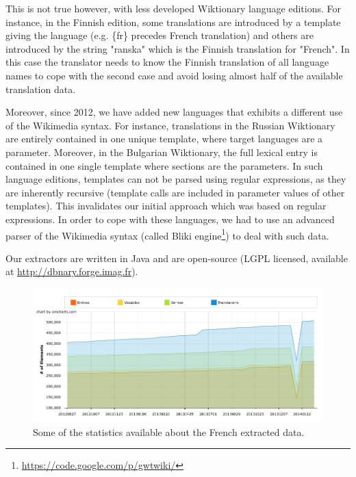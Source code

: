 \documentclass[10pt, a4paper]{article}
\begin{document}
This is not true however, with less developed Wiktionary language editions. For instance, in the Finnish edition, some translations are introduced by a template giving the language (e.g. \{fr\} precedes French translation) and others are introduced by the string "ranska" which is the Finnish translation for "French". In this case the translator needs to know the Finnish translation of all language names to cope with the second case and avoid losing almost half of the available translation data.

Moreover, since 2012, we have added new languages that exhibits a different use of the Wikimedia syntax. For instance, translations in the Russian Wiktionary are entirely contained in one unique template, where target languages are a parameter. Moreover, in the Bulgarian Wiktionary, the full lexical entry is contained in one single template where sections are the parameters. In such language editions, templates can not be parsed using regular expressions, as they are inherently recursive (template calls are included in parameter values of other templates). This invalidates our initial approach which was based on regular expressions. In order to cope with these languages, we had to use an advanced parser of the Wikimedia syntax (called Bliki engine\footnote{\url{https://code.google.com/p/gwtwiki/}}) to deal with such data.

Our extractors are written in Java and are open-source (LGPL licensed, available at \url{http://dbnary.forge.imag.fr}).


\begin{figure}[htb]
	\begin{center}
		\includegraphics[width=\textwidth]{french.png}
	\end{center}
	\caption{Some of the statistics available about the French extracted data.}
	\label{fig:french}
\end{figure}
\end{document}
